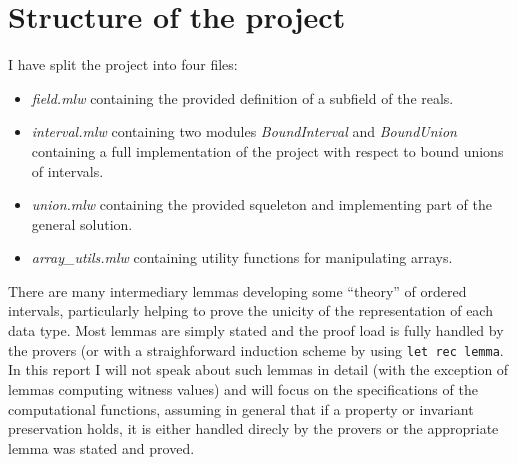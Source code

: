 \section*{Structure of the project}
I have split the project into four files:
\begin{itemize}
  \item \textit{field.mlw} containing the provided definition of a subfield of the
    reals.
  \item \textit{interval.mlw} containing two modules \textit{BoundInterval} and
    \textit{BoundUnion} containing a full implementation of the project with respect
    to bound unions of intervals.
  \item \textit{union.mlw} containing the provided squeleton and implementing part of
    the general solution.
  \item \textit{array\_utils.mlw} containing utility functions for manipulating
    arrays.
\end{itemize}

There are many intermediary lemmas developing some ``theory'' of ordered intervals,
particularly helping to prove the unicity of the representation of each data type.
%
Most lemmas are simply stated and the proof load is fully handled by the provers (or
with a straighforward induction scheme by using \texttt{let rec lemma}. In
this report I will not speak about such lemmas in detail (with the exception of
lemmas computing witness values) and will focus on the specifications of the
computational functions, assuming in general that if a property or invariant
preservation holds, it is either handled direcly by the provers or the appropriate
lemma was stated and proved.
%
